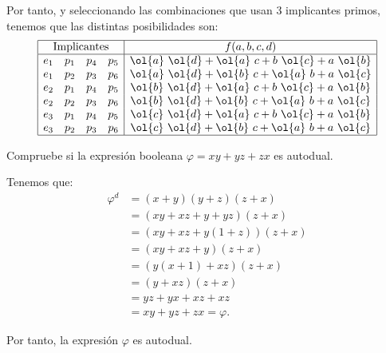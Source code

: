 \begin{ejercicio}
    Por tanto, y seleccionando las combinaciones que usan 3 implicantes primos, tenemos que las distintas posibilidades son:
    \begin{equation*}
        \begin{array}{|cccc|c|}
            \hline
            \multicolumn{4}{|c|}{\text{Implicantes}} & f(a,b,c,d) \\ \hline
            e_1 & p_1 & p_4 & p_5 & \ol{a}~\ol{d} + \ol{a}~c + b~\ol{c} + a~\ol{b} \\
            e_1 & p_2 & p_3 & p_6 & \ol{a}~\ol{d} + \ol{b}~c + \ol{a}~b + a~\ol{c} \\
            e_2 & p_1 & p_4 & p_5 & \ol{b}~\ol{d} + \ol{a}~c + b~\ol{c} + a~\ol{b} \\
            e_2 & p_2 & p_3 & p_6 & \ol{b}~\ol{d} + \ol{b}~c + \ol{a}~b + a~\ol{c} \\
            e_3 & p_1 & p_4 & p_5 & \ol{c}~\ol{d} + \ol{a}~c + b~\ol{c} + a~\ol{b} \\
            e_3 & p_2 & p_3 & p_6 & \ol{c}~\ol{d} + \ol{b}~c + \ol{a}~b + a~\ol{c} \\ \hline
        \end{array}
    \end{equation*}
\end{ejercicio}




\begin{ejercicio}
    Compruebe si la expresión booleana $\varphi=xy+yz+zx$ es autodual.

    Tenemos que:
    \begin{align*}
        \varphi^d &= (x+y)(y+z)(z+x)\\
        &= (xy + xz + y + yz)(z + x)\\
        &= (xy + xz + y(1+z))(z + x)\\
        &= (xy + xz + y)(z + x)\\
        &= (y(x+1) + xz)(z + x)\\
        &= (y + xz)(z + x)\\
        &= yz + yx + xz + xz\\
        &= xy + yz + zx = \varphi.
    \end{align*}

    Por tanto, la expresión $\varphi$ es autodual.
\end{ejercicio}